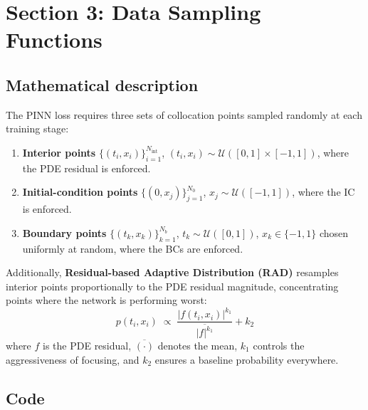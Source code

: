 \documentclass[11pt,a4paper]{article}
\begin{document}
\section{Section 3: Data Sampling Functions}
\label{sec:sampling}

\subsection*{Mathematical description}

The PINN loss requires three sets of collocation points sampled randomly
at each training stage:

\begin{enumerate}[nosep]
  \item \textbf{Interior points} $\{(t_i, x_i)\}_{i=1}^{N_{\mathrm{int}}}$,
        $(t_i, x_i) \sim \mathcal{U}([0,1] \times [-1,1])$, where the PDE
        residual is enforced.
  \item \textbf{Initial-condition points} $\{(0, x_j)\}_{j=1}^{N_0}$,
        $x_j \sim \mathcal{U}([-1,1])$, where the IC is enforced.
  \item \textbf{Boundary points} $\{(t_k, x_k)\}_{k=1}^{N_b}$,
        $t_k \sim \mathcal{U}([0,1])$, $x_k \in \{-1, 1\}$ chosen uniformly
        at random, where the BCs are enforced.
\end{enumerate}

Additionally, \textbf{Residual-based Adaptive Distribution (RAD)} resamples
interior points proportionally to the PDE residual magnitude, concentrating
points where the network is performing worst:
\begin{equation}
  p(t_i, x_i) \;\propto\;
  \frac{|f(t_i, x_i)|^{k_1}}{\overline{|f|^{k_1}}} + k_2
\label{eq:rad}
\end{equation}
where $f$ is the PDE residual, $\overline{(\cdot)}$ denotes the mean,
$k_1$ controls the aggressiveness of focusing, and $k_2$ ensures a
baseline probability everywhere.

\subsection*{Code}
\end{document}
